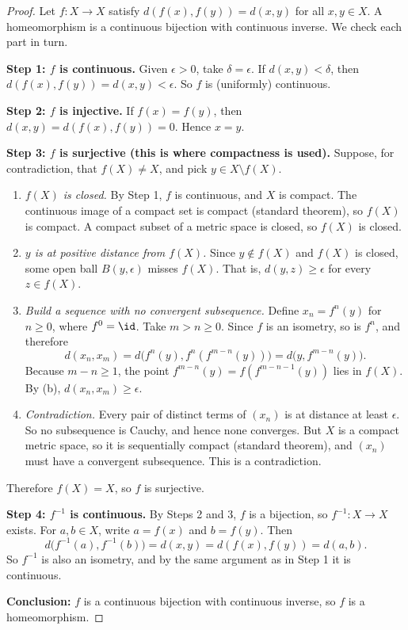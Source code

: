 
\begin{proof}
Let $f\colon X\to X$ satisfy $d(f(x),f(y))=d(x,y)$ for all $x,y\in X$. A homeomorphism is a
continuous bijection with continuous inverse. We check each part in turn.

\textbf{Step 1: $f$ is continuous.} Given $\epsilon>0$, take $\delta=\epsilon$. If
$d(x,y)<\delta$, then $d(f(x),f(y))=d(x,y)<\epsilon$. So $f$ is (uniformly) continuous.

\textbf{Step 2: $f$ is injective.} If $f(x)=f(y)$, then $d(x,y)=d(f(x),f(y))=0$. Hence $x=y$.

\textbf{Step 3: $f$ is surjective (this is where compactness is used).} Suppose, for
contradiction, that $f(X)\neq X$, and pick $y\in X\setminus f(X)$.
\begin{enumerate}[label=(\alph*)]
  \item \emph{$f(X)$ is closed.} By Step 1, $f$ is continuous, and $X$ is compact. The
        continuous image of a compact set is compact (standard theorem), so $f(X)$ is compact.
        A compact subset of a metric space is closed, so $f(X)$ is closed.
  \item \emph{$y$ is at positive distance from $f(X)$.} Since $y\notin f(X)$ and $f(X)$ is
        closed, some open ball $B(y,\epsilon)$ misses $f(X)$. That is, $d(y,z)\ge\epsilon$ for
        every $z\in f(X)$.
  \item \emph{Build a sequence with no convergent subsequence.} Define $x_n=f^n(y)$ for
        $n\ge0$, where $f^0=\id$. Take $m>n\ge0$. Since $f$ is an isometry, so is $f^n$, and
        therefore
        \[ d(x_n,x_m)=d\bigl(f^n(y),f^n(f^{m-n}(y))\bigr)=d\bigl(y,f^{m-n}(y)\bigr). \]
        Because $m-n\ge1$, the point $f^{m-n}(y)=f(f^{m-n-1}(y))$ lies in $f(X)$. By (b),
        $d(x_n,x_m)\ge\epsilon$.
  \item \emph{Contradiction.} Every pair of distinct terms of $(x_n)$ is at distance at least
        $\epsilon$. So no subsequence is Cauchy, and hence none converges. But $X$ is a compact
        metric space, so it is sequentially compact (standard theorem), and $(x_n)$ must have a
        convergent subsequence. This is a contradiction.
\end{enumerate}
Therefore $f(X)=X$, so $f$ is surjective.

\textbf{Step 4: $f^{-1}$ is continuous.} By Steps 2 and 3, $f$ is a bijection, so
$f^{-1}\colon X\to X$ exists. For $a,b\in X$, write $a=f(x)$ and $b=f(y)$. Then
\[ d\bigl(f^{-1}(a),f^{-1}(b)\bigr)=d(x,y)=d(f(x),f(y))=d(a,b). \]
So $f^{-1}$ is also an isometry, and by the same argument as in Step 1 it is continuous.

\textbf{Conclusion:} $f$ is a continuous bijection with continuous inverse, so $f$ is a
homeomorphism.
\end{proof}
